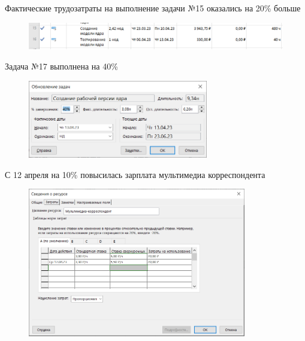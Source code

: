 Фактические трудозатраты на выполнение задачи №15 оказались на 20\% больше

\begin{figure}[H]
	\begin{center}
		\includegraphics[width=\textwidth]{imgs/task_1_6.png}
	\end{center}
\end{figure}

Задача №17 выполнена на 40\%

\begin{figure}[H]
	\begin{center}
		\includegraphics[width=0.7\textwidth]{imgs/task_1_7.png}
	\end{center}
\end{figure}

С 12 апреля на 10\% повысилась зарплата мультимедиа корреспондента

\begin{figure}[H]
	\begin{center}
		\includegraphics[width=0.85\textwidth]{imgs/task_1_8.png}
	\end{center}
\end{figure}

